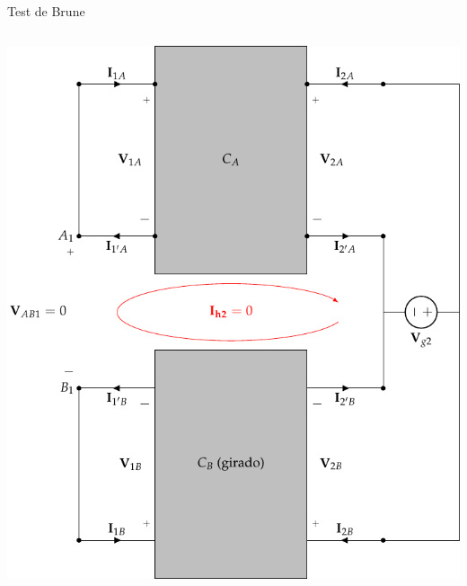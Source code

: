 \documentclass[aspectratio=169, usenames,svgnames,dvipsnames]{beamer}
\begin{document}
\begin{frame}[label={sec:orgd8e5d9e},plain]{Test de Brune}
\begin{columns}
\begin{column}{0.5\columnwidth}
\begin{center}
\includegraphics[height=0.8\textheight]{../figs/paralelo-paralelo-brune-salida.pdf}
\end{center}
\end{column}
\end{columns}
\end{frame}
\end{document}
